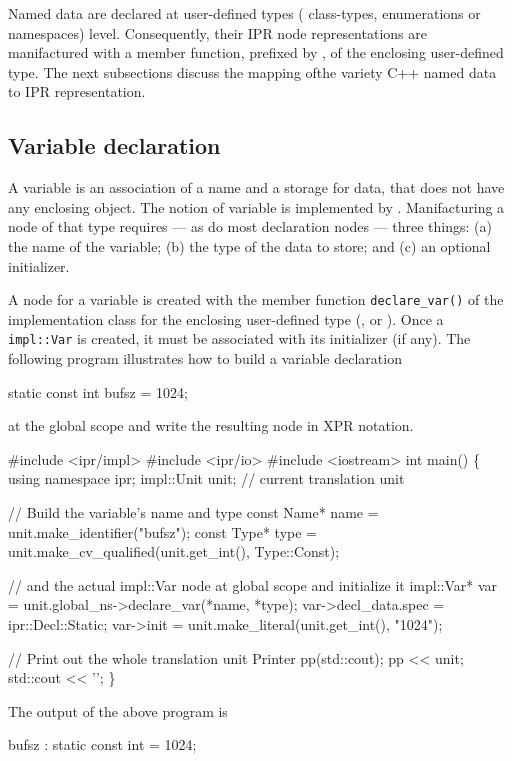 \documentclass[a4paper,12pt]{article}
\begin{document}
Named data are declared at user-defined types (\ie{} class-types,
enumerations or namespaces) level.  Consequently, their IPR node
representations are  manifactured with a member function, prefixed by
, of the enclosing user-defined type. The next subsections
discuss the mapping ofthe variety C++ named data to IPR representation.

\subsection{Variable declaration}
\label{sec:decl.variable}

A variable is an association of a name and a storage for data, that does not
have any enclosing object. The notion of variable is implemented by
.  Manifacturing a node of that type requires ---
as do most declaration nodes --- three things: (a) the name of the variable;
(b) the type of the data to store; and (c) an optional initializer.

A node for a variable is created with the member function
\texttt{declare\_var()} of the implementation class for the enclosing
user-defined type (,  or
).  Once a \texttt{impl::Var} is
created, it must be 
associated with its initializer (if any).  The following program
illustrates how to build a variable declaration 
\begin{Program}
  static const int bufsz = 1024;
\end{Program}
at the global scope and write the resulting node in XPR notation.
\begin{Program}
#include <ipr/impl>
#include <ipr/io>
#include <iostream>
int main()
\{
   using namespace ipr;
   impl::Unit unit;              // current translation unit
   
   // Build the variable's name and type
   const Name* name = unit.make_identifier("bufsz");
   const Type* type = unit.make_cv_qualified(unit.get_int(), Type::Const);

   // and the actual impl::Var node at global scope and initialize it
   impl::Var* var = unit.global_ns->declare_var(*name, *type);
   var->decl_data.spec = ipr::Decl::Static;
   var->init = unit.make_literal(unit.get_int(), "1024");
   
   // Print out the whole translation unit
   Printer pp(std::cout);
   pp << unit;
   std::cout << '';
\}
\end{Program}
The output of the above program is
\begin{Output}
  bufsz : static const int = 1024;
\end{Output}
\end{document}
